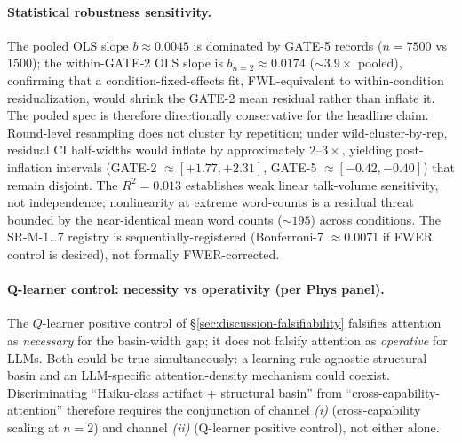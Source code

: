 \paragraph{Statistical robustness sensitivity.}
The pooled OLS slope $b \approx 0.0045$ is dominated by GATE-5 records ($n = 7500$ vs $1500$); the within-GATE-2 OLS slope is $b_{n=2} \approx 0.0174$ ($\sim 3.9\times$ pooled), confirming that a condition-fixed-effects fit, FWL-equivalent to within-condition residualization, would shrink the GATE-2 mean residual rather than inflate it. The pooled spec is therefore directionally conservative for the headline claim. Round-level resampling does not cluster by repetition; under wild-cluster-by-rep, residual CI half-widths would inflate by approximately $2$--$3\times$, yielding post-inflation intervals (GATE-2 $\approx [+1.77, +2.31]$, GATE-5 $\approx [-0.42, -0.40]$) that remain disjoint. The $R^2 = 0.013$ establishes weak linear talk-volume sensitivity, not independence; nonlinearity at extreme word-counts is a residual threat bounded by the near-identical mean word counts ($\sim 195$) across conditions. The SR-M-1\ldots7 registry is sequentially-registered (Bonferroni-7 $\approx 0.0071$ if FWER control is desired), not formally FWER-corrected.

\paragraph{Q-learner control: necessity vs operativity (per Phys panel).}
The $Q$-learner positive control of \S\ref{sec:discussion-falsifiability} falsifies attention as \emph{necessary} for the basin-width gap; it does not falsify attention as \emph{operative} for LLMs. Both could be true simultaneously: a learning-rule-agnostic structural basin and an LLM-specific attention-density mechanism could coexist. Discriminating ``Haiku-class artifact $+$ structural basin'' from ``cross-capability-attention'' therefore requires the conjunction of channel \emph{(i)} (cross-capability scaling at $n = 2$) and channel \emph{(ii)} (Q-learner positive control), not either alone.

